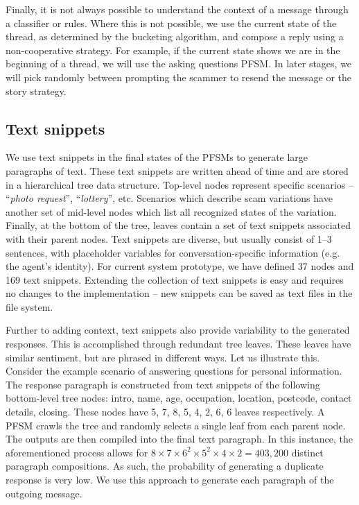 Finally, it is not always possible to understand the context of a message through a classifier or rules.
Where this is not possible, we use the current state of the thread, as determined by the bucketing algorithm, and compose a reply using a non-cooperative strategy. For example, if the current state shows we are in the beginning of a thread, we will use the asking questions PFSM. In later stages, we will pick randomly between prompting the scammer to resend the message or the story strategy.

\subsection{Text snippets}

We use text snippets in the final states of the PFSMs to generate large paragraphs of text. These text snippets are written ahead of time and are stored in a hierarchical tree data structure. Top-level nodes represent specific scenarios -- “\textit{photo request}”, “\textit{lottery}”, etc. Scenarios which describe scam variations have another set of mid-level nodes which list all recognized states of the variation. Finally, at the bottom of the tree, leaves contain a set of text snippets associated with their parent nodes. Text snippets are diverse, but usually consist of 1--3 sentences, with placeholder variables for conversation-specific information (e.g. the agent's identity). For current system prototype, we have defined 37 nodes and 169 text snippets. Extending the collection of text snippets is easy and requires no changes to the implementation -- new snippets can be saved as text files in the file system.

Further to adding context, text snippets also provide variability to the generated responses. This is accomplished through redundant tree leaves. These leaves have similar sentiment, but are phrased in different ways. Let us illustrate this. Consider the example scenario of answering questions for personal information. The response paragraph is constructed from text snippets of the following bottom-level tree nodes: intro, name, age, occupation, location, postcode, contact details, closing. These nodes have 5, 7, 8, 5, 4, 2, 6, 6 leaves respectively. A PFSM crawls the tree and randomly selects a single leaf from each parent node. The outputs are then compiled into the final text paragraph. In this instance, the aforementioned process allows for $8 \times 7 \times 6^2 \times 5 ^ 2 \times 4 \times 2 = 403,200$ distinct paragraph compositions. As such, the probability of generating a duplicate response is very low. We use this approach to generate each paragraph of the outgoing message.

